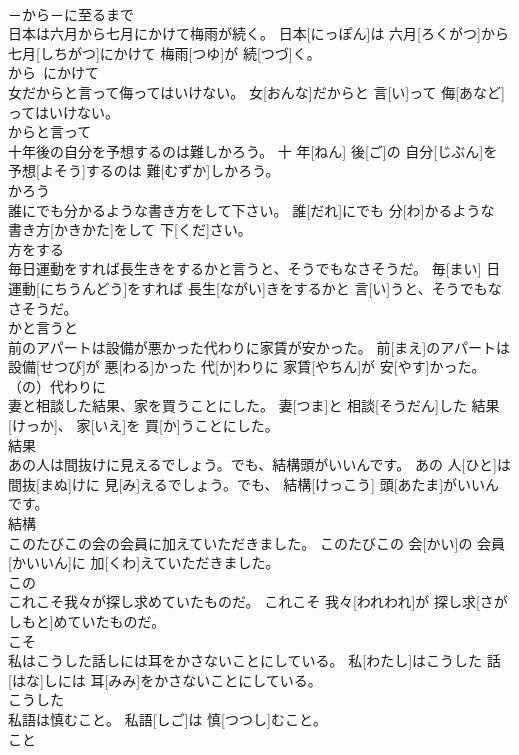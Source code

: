 \documentclass[8pt]{extreport}
\begin{document}
\begin{CJK}{UTF8}{min}
\\	－から－に至るまで	
\\	日本は六月から七月にかけて梅雨が続く。	日本[にっぽん]は 六月[ろくがつ]から 七月[しちがつ]にかけて 梅雨[つゆ]が 続[つづ]く。	
\\	から~にかけて	
\\	女だからと言って侮ってはいけない。	女[おんな]だからと 言[い]って 侮[あなど]ってはいけない。	
\\	からと言って	
\\	十年後の自分を予想するのは難しかろう。	十 年[ねん] 後[ご]の 自分[じぶん]を 予想[よそう]するのは 難[むずか]しかろう。	
\\	かろう	
\\	誰にでも分かるような書き方をして下さい。	誰[だれ]にでも 分[わ]かるような 書き方[かきかた]をして 下[くだ]さい。	
\\	方をする	
\\	毎日運動をすれば長生きをするかと言うと、そうでもなさそうだ。	毎[まい] 日運動[にちうんどう]をすれば 長生[ながい]きをするかと 言[い]うと、そうでもなさそうだ。	
\\	かと言うと	
\\	前のアパートは設備が悪かった代わりに家賃が安かった。	前[まえ]のアパートは 設備[せつび]が 悪[わる]かった 代[か]わりに 家賃[やちん]が 安[やす]かった。	
\\	（の）代わりに	
\\	妻と相談した結果、家を買うことにした。	妻[つま]と 相談[そうだん]した 結果[けっか]、 家[いえ]を 買[か]うことにした。	
\\	結果	
\\	あの人は間抜けに見えるでしょう。でも、結構頭がいいんです。	あの 人[ひと]は 間抜[まぬ]けに 見[み]えるでしょう。でも、 結構[けっこう] 頭[あたま]がいいんです。	
\\	結構	
\\	このたびこの会の会員に加えていただきました。	このたびこの 会[かい]の 会員[かいいん]に 加[くわ]えていただきました。	
\\	この	
\\	これこそ我々が探し求めていたものだ。	これこそ 我々[われわれ]が 探し求[さがしもと]めていたものだ。	
\\	こそ	
\\	私はこうした話しには耳をかさないことにしている。	私[わたし]はこうした 話[はな]しには 耳[みみ]をかさないことにしている。	
\\	こうした	
\\	私語は慎むこと。	私語[しご]は 慎[つつし]むこと。	
\\	こと	

\end{CJK}
\end{document}
